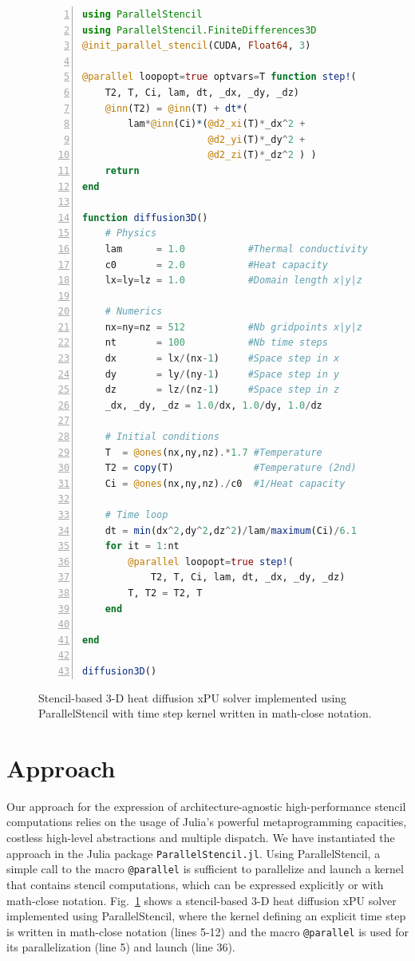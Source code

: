 \documentclass{juliacon}
\begin{document}
\begin{figure}[t]
\begin{lstlisting}[language = Julia, numbers=left, numberstyle=\tiny\color{gray}]
using ParallelStencil
using ParallelStencil.FiniteDifferences3D
@init_parallel_stencil(CUDA, Float64, 3)

@parallel loopopt=true optvars=T function step!(
    T2, T, Ci, lam, dt, _dx, _dy, _dz)
    @inn(T2) = @inn(T) + dt*(
        lam*@inn(Ci)*(@d2_xi(T)*_dx^2 + 
                      @d2_yi(T)*_dy^2 + 
                      @d2_zi(T)*_dz^2 ) )
    return
end

function diffusion3D()
    # Physics
    lam      = 1.0           #Thermal conductivity
    c0       = 2.0           #Heat capacity
    lx=ly=lz = 1.0           #Domain length x|y|z

    # Numerics
    nx=ny=nz = 512           #Nb gridpoints x|y|z
    nt       = 100           #Nb time steps
    dx       = lx/(nx-1)     #Space step in x
    dy       = ly/(ny-1)     #Space step in y
    dz       = lz/(nz-1)     #Space step in z
    _dx, _dy, _dz = 1.0/dx, 1.0/dy, 1.0/dz

    # Initial conditions
    T  = @ones(nx,ny,nz).*1.7 #Temperature
    T2 = copy(T)              #Temperature (2nd)
    Ci = @ones(nx,ny,nz)./c0  #1/Heat capacity

    # Time loop
    dt = min(dx^2,dy^2,dz^2)/lam/maximum(Ci)/6.1
    for it = 1:nt
        @parallel loopopt=true step!(
            T2, T, Ci, lam, dt, _dx, _dy, _dz)
        T, T2 = T2, T
    end

end

diffusion3D()

\end{lstlisting}

\caption{Stencil-based 3-D heat diffusion xPU solver implemented using ParallelStencil with time step kernel written in math-close notation.}
	\label{fig:code}
\end{figure}

\section{Approach}
Our approach for the expression of architecture-agnostic high-performance stencil computations relies on the usage of Julia's powerful metaprogramming capacities, costless high-level abstractions and multiple dispatch. We have instantiated the approach in the Julia package \texttt{ParallelStencil.jl}. Using ParallelStencil, a simple call to the macro \texttt{@parallel} is sufficient to parallelize and launch a kernel that contains stencil computations, which can be expressed explicitly or with math-close notation. Fig.~\ref{fig:code} shows a stencil-based 3-D heat diffusion xPU solver implemented using ParallelStencil, where the kernel defining an explicit time step is written in math-close notation (lines 5-12) and the macro \texttt{@parallel} is used for its parallelization (line 5) and launch (line 36). 
\end{document}
